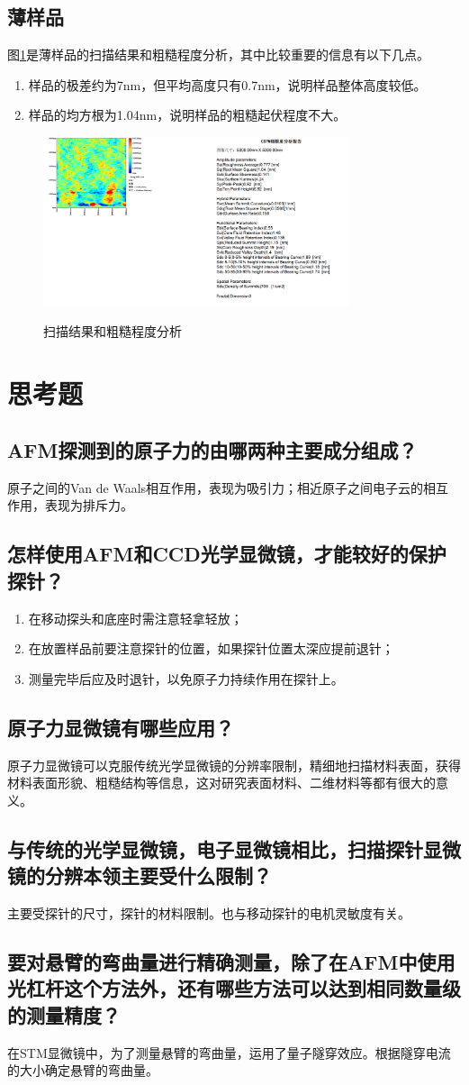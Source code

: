 \documentclass[a4paper]{article}
\begin{document}
\subsection{薄样品}
图\ref{fig9}是薄样品的扫描结果和粗糙程度分析，其中比较重要的信息有以下几点。
\begin{enumerate}
	\item 样品的极差约为7nm，但平均高度只有0.7nm，说明样品整体高度较低。
	\item 样品的均方根为1.04nm，说明样品的粗糙起伏程度不大。
\end{enumerate}
\begin{figure}[htbp]
\centering
\includegraphics[width=0.8\textwidth]{data/1/hengxl001_ROU.png}\\
\caption{扫描结果和粗糙程度分析}\label{fig9}
\end{figure}

\section{思考题}
\subsection{AFM探测到的原子力的由哪两种主要成分组成？}
原子之间的Van de Waals相互作用，表现为吸引力；相近原子之间电子云的相互作用，表现为排斥力。
\subsection{怎样使用AFM和CCD光学显微镜，才能较好的保护探针？}
\begin{enumerate}
	\item 在移动探头和底座时需注意轻拿轻放；
	\item 在放置样品前要注意探针的位置，如果探针位置太深应提前退针；
	\item 测量完毕后应及时退针，以免原子力持续作用在探针上。
\end{enumerate}
\subsection{原子力显微镜有哪些应用？}
原子力显微镜可以克服传统光学显微镜的分辨率限制，精细地扫描材料表面，获得材料表面形貌、粗糙结构等信息，这对研究表面材料、二维材料等都有很大的意义。
\subsection{与传统的光学显微镜，电子显微镜相比，扫描探针显微镜的分辨本领主要受什么限制？}
主要受探针的尺寸，探针的材料限制。也与移动探针的电机灵敏度有关。
\subsection{要对悬臂的弯曲量进行精确测量，除了在AFM中使用光杠杆这个方法外，还有哪些方法可以达到相同数量级的测量精度？}
在STM显微镜中，为了测量悬臂的弯曲量，运用了量子隧穿效应。根据隧穿电流的大小确定悬臂的弯曲量。

\nocite{jiaocai}

\end{document}
